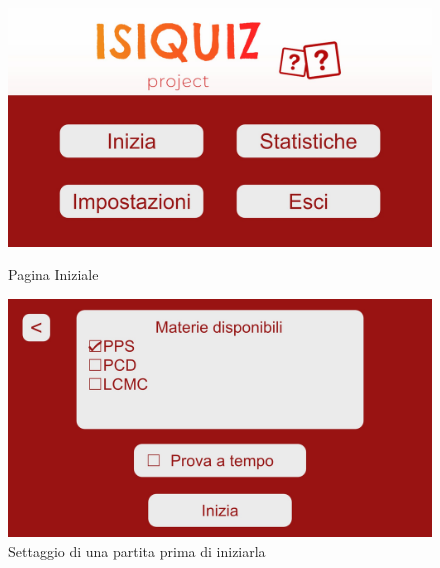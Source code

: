         \begin{figure}[H]
          \centering
          \begin{minipage}[b]{0.48\textwidth}
            \includegraphics[width=\textwidth]{Images/mockup/home1.jpg}
            \caption{Pagina Iniziale}
            \label{fig:HomePage1}
          \end{minipage}
          \hfill
          \begin{minipage}[b]{0.48\textwidth}
            \includegraphics[width=\textwidth]{Images/mockup/start1.jpg}
            \caption{Settaggio di una partita prima di iniziarla}
            \label{fig:Start1}
          \end{minipage}
        \end{figure}

